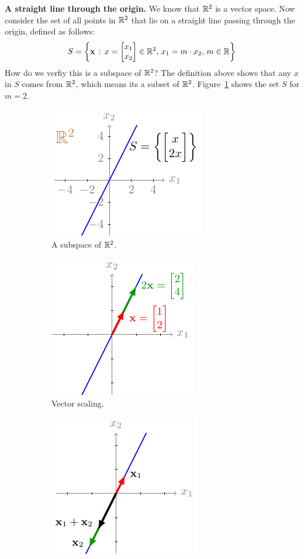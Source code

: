\begin{example}
    \textbf{A straight line through the origin.} We know that $\mathbb{R}^2$ is a vector space. Now consider the set of all points in $\mathbb{R}^2$ that lie on a straight line passing through the origin, defined as follows:
    \[ S = \lc \mf{x} \, : \, x = \bmx x_1 \\ x_2 \emx \in \mb{R}^2, \, x_1 = m \cdot x_2, \, m \in \mb{R} \rc \]
    How do we verfiy this is a subspace of $\mathbb{R}^2$? The definition above shows that any $x$ in $S$ comes from $\mathbb{R}^2$, which means its a subset of $\mathbb{R}^2$. Figure~\ref{fig:subspace1} shows the set $S$ for $m = 2$.
    \begin{figure}[h]
    \centering
    \begin{subfigure}[b]{0.32\textwidth}
        \includegraphics{figure/chapter01/subspace1(a).pdf}
        \caption{A subspace of $\mathbb{R}^2$.}
        \label{fig:subspace1}
    \end{subfigure}
    \begin{subfigure}[b]{0.32\textwidth}
        \centering
        \includegraphics{figure/chapter01/subspace1(b).pdf}
        \caption{Vector scaling.}
        \label{fig:subspace1-scale}
    \end{subfigure}
    \begin{subfigure}[b]{0.32\textwidth}
        \centering
        \includegraphics{figure/chapter01/subspace1(c).pdf}

\end{subfigure}
\end{figure}
\end{example}
